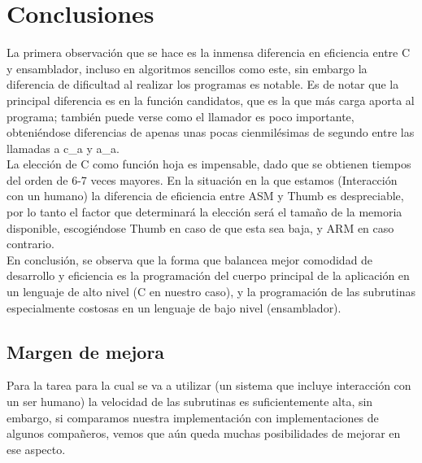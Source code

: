 \documentclass[12pt,letterpaper]{article}
\begin{document}
\section{Conclusiones}

La primera observaci\'on que se hace es la inmensa diferencia en
eficiencia entre C y ensamblador, incluso en algoritmos sencillos como
este, sin embargo la diferencia de dificultad al realizar los
programas es notable. Es de notar que la principal diferencia es en la
funci\'on candidatos, que es la que m\'as carga aporta al programa;
tambi\'en puede verse como el llamador es poco importante, obteni\'endose
diferencias de apenas unas pocas cienmil\'esimas de segundo entre las
llamadas a c\_a y a\_a. \\
La elecci\'on de C como funci\'on hoja es impensable, dado que se obtienen
tiempos del orden de 6-7 veces mayores. En la situaci\'on en la que
estamos (Interacci\'on con un humano) la diferencia de eficiencia entre
ASM y Thumb es despreciable, por lo tanto el factor que determinar\'a la
elecci\'on ser\'a el tamaño de la memoria disponible, escogi\'endose Thumb
en caso de que esta sea baja, y ARM en caso contrario.\\
En conclusi\'on, se observa que la forma que balancea mejor comodidad de
desarrollo y eficiencia es la programaci\'on del cuerpo principal de la
aplicaci\'on en un lenguaje de alto nivel (C en nuestro caso), y la
programaci\'on de las subrutinas especialmente costosas en un lenguaje
de bajo nivel (ensamblador).

\subsection{Margen de mejora}
Para la tarea para la cual se va a utilizar (un sistema que incluye
interacci\'on con un ser humano) la velocidad de las subrutinas es
suficientemente alta, sin embargo, si comparamos nuestra
implementaci\'on con implementaciones de algunos compañeros, vemos que
a\'un queda muchas posibilidades de mejorar en ese aspecto.
\clearpage
\end{document}
